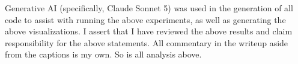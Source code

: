 Generative AI (specifically, Claude Sonnet 5) was used in the generation of all code to assist
with running the above experiments, as well as generating the above visualizations. I assert
that I have reviewed the above results and claim responsibility for the above statements. All
commentary in the writeup aside from the captions is my own. So is all analysis above.
